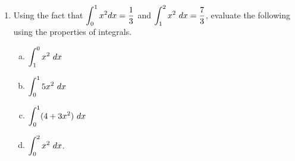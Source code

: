 \documentclass[11pt,fleqn]{article}
\newcommand{\ee}{\end{enumerate}}
\begin{document}
\begin{enumerate}
\item  Using the fact that $\displaystyle \int_0^1 x^2 dx = \frac 1 3$ and $\displaystyle \int_{1}^{2} x^{2}\ dx = \frac{7}{3}$,
evaluate the following using the properties of integrals. 

  \begin{multicols}{4}{
      \vspace*{-0.45in}
      \begin{enumerate}[(a)]
      \item $\displaystyle \int_1^0 x^2 \ dx$
      \item $\displaystyle \int_0^1 5x^2\  dx$
      \item $\d \int_0^1 ( 4 + 3x^2)\ dx$
       \item $\d \int_0^2 x^{2}\ dx$. 
      \end{enumerate}}
  \end{multicols}
\vfill
\newpage



\ee
\end{document}

